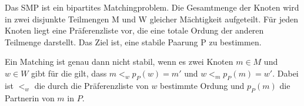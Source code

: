 Das SMP ist ein bipartites Matchingproblem. Die Gesamtmenge der Knoten wird in zwei disjunkte Teilmengen M und W gleicher Mächtigkeit aufgeteilt. Für jeden Knoten liegt eine Präferenzliste vor, die eine totale Ordung der anderen Teilmenge darstellt. Das Ziel ist, eine stabile Paarung P zu bestimmen.

\begin{Definition}
\label{stabil}
  Ein Matching ist genau dann nicht stabil, wenn es zwei Knoten $m \in M$ und $w \in W$ gibt für die gilt, dass $m <_{w} p_{P}(w) = m'$ und $w <_{m} p_{P}(m) = w'$. Dabei ist $<_{w}$ die durch die Präferenzliste von $w$ bestimmte Ordung und $p_{P}(m)$ die Partnerin von $m$ in $P$.
\end{Definition}
